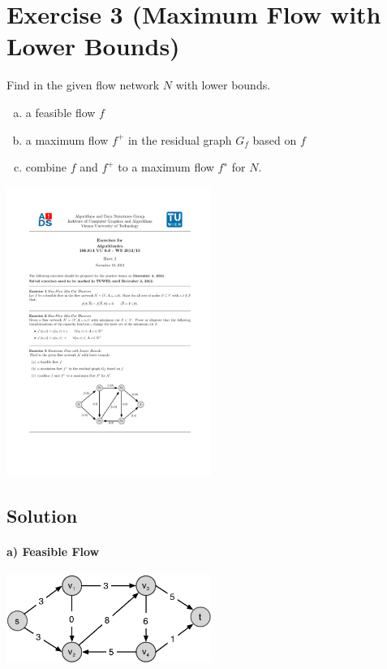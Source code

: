 \documentclass[a4paper, 12pt]{report}
\begin{document}
\section{Exercise 3 (Maximum Flow with Lower Bounds)}

Find in the given flow network $N$ with lower bounds.

\begin{enumerate}[a)]
    \item a feasible flow $f$
    \item a maximum flow $f^+$ in the residual graph $G_f$ based on $f$
    \item combine $f$ and $f^+$ to a maximum flow $f^∗$ for $N$.
\end{enumerate}

\begin{center}
    \includegraphics[width=0.5\textwidth]{Figures/Exercise_2_3}
\end{center}

\subsection{Solution}

\paragraph{a) Feasible Flow}

\begin{center}
    \includegraphics[width=0.5\textwidth]{Figures/Exercise_2_3_a}
\end{center}
\end{document}
